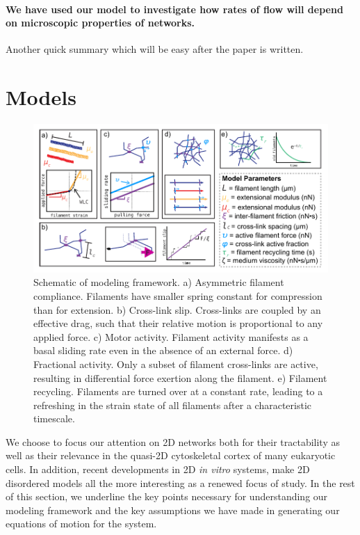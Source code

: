 \documentclass[10pt,letterpaper]{article}
\begin{document}
  

\paragraph{We have used our model to investigate how rates of flow will depend on microscopic properties of networks.}
Another quick summary which will be easy after the paper is written. 


\section*{Models}

\begin{figure}[h!]
\centering
\includegraphics[width=\hsize]{figures/fig2/fig2}
\caption{\label{fig:sim} Schematic of modeling framework. a) Asymmetric filament compliance.  Filaments have smaller spring constant for compression than for extension. b) Cross-link slip.  Cross-links are coupled by an effective drag, such that their relative motion is proportional to any applied force. c) Motor activity. Filament activity manifests as a basal sliding rate even in the absence of an external force. d) Fractional activity.  Only a subset of filament cross-links are active, resulting in differential force exertion along the filament.  e)  Filament recycling.  Filaments are turned over at a constant rate, leading to a refreshing in the strain state of all filaments after a characteristic timescale.}
\end{figure}

We choose to focus our attention on 2D networks both for their tractability as well as their relevance in the quasi-2D cytoskeletal cortex of many eukaryotic cells\cite{cellmech_flows}.  In addition, recent developments in 2D {\em in vitro} systems\cite{rheo_2D1,rheo_2D2}, make 2D disordered models all the more interesting as a renewed focus of study.  In the rest of this section, we underline the key points necessary for understanding our modeling framework and the key assumptions we have made in generating our equations of motion for the system.
\end{document}
